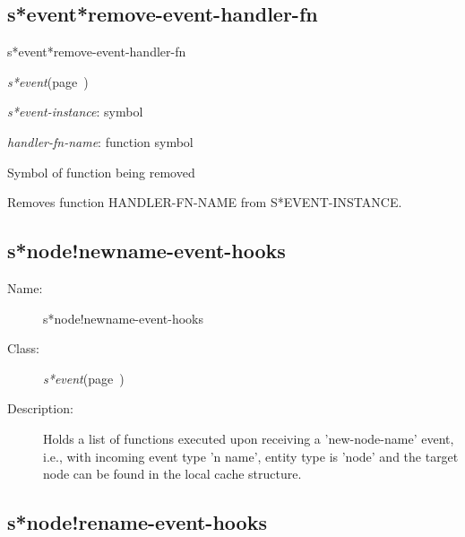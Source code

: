 \subsection{s*event*remove-event-handler-fn}
\label{s*event*remove-event-handler-fn}

\begin{description}
\item [Name:]  s*event*remove-event-handler-fn

\item [Class:]
{\sl s*event}\hfill(page~\pageref{s*event})

\item [Parameters:]
\item {\sl s*event-instance}:  symbol

\item {\sl handler-fn-name}:  function symbol


\item [Return-value:] Symbol of function being removed

\item [Description:] 
Removes function HANDLER-FN-NAME from S*EVENT-INSTANCE. 

\item [Public:]



\end{description}
\horizontalline

\subsection{s*node!newname-event-hooks}
\label{s*node!newname-event-hooks}

\begin{description}
\item [Name:]  s*node!newname-event-hooks

\item [Class:]
{\sl s*event}\hfill(page~\pageref{s*event})

\item [Description:]
Holds a list of functions executed upon receiving a
'new-node-name' event, i.e., with incoming event type 'n
name', entity type is 'node' and the target node can be
found in the local cache structure. 


\end{description}
\horizontalline

\subsection{s*node!rename-event-hooks}
\label{s*node!rename-event-hooks}

